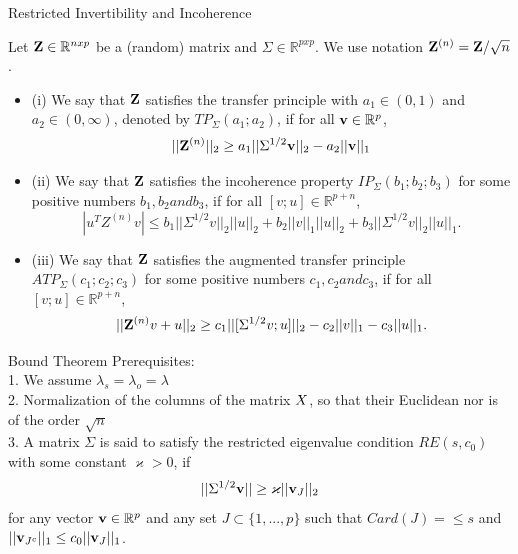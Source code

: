 \documentclass[unknownkeysallowed]{beamer}
\begin{document}
\begin{frame}{Restricted Invertibility and Incoherence}
	\begin{definition}
		Let $ \bold{Z} \in \mathbb{R}^{nxp} $ be a (random) matrix and $ \Sigma \in \mathbb{R}^{pxp} $. We use notation $ \bold{Z}^{(n)} = \bold{Z}/\sqrt{n}$.\\
		\begin{itemize}
			\item (i) We say that $\bold{Z}$ satisfies the transfer principle with $a_1 \in (0,1)$ and $a_2 \in (0,\infty)$, denoted by $TP_{\Sigma}(a_1;a_2)$, if for all $\bold{v} \in \mathbb{R}^p$,
			\begin{equation}
			||\bold{Z}^{(n)}||_2 \geq a_1 ||\Sigma^{1/2}\bold{v}||_2 - a_2||\bold{v}||_1
			\end{equation}
			
			\item (ii) We say that $\bold{Z}$ satisfies the incoherence property $IP_{\Sigma}(b_1;b_2;b_3)$ for some positive numbers $b_1, b_2 and b_3$, if for all $[v;u] \in \mathbb{R}^{p+n}$,
			\begin{equation}
			|u^T Z^{(n)}v| \leq b_1||\Sigma^{1/2}v||_2||u||_2 + b_2||v||_1||u||_2 + b_3||\Sigma^{1/2}v||_2||u||_1.
			\end{equation}
			\item (iii) We say that $ \bold{Z} $ satisfies the augmented transfer principle $ATP_{\Sigma}(c_1;c_2;c_3)$ for some positive numbers $c_1, c_2 and c_3$, if for all $[v;u]\in \mathbb{R}^{p+n}$,
			\begin{equation}
			||\bold{Z}^{(n)}v+u||_2 \geq c_1||[\Sigma^{1/2}v;u]||_2 - c_2||v||_1 - c_3||u||_1.
			\end{equation}
		\end{itemize}
	\end{definition}
\end{frame}


\begin{frame}{Bound Theorem}
	Prerequisites:\\
	1. We assume $\lambda_s = \lambda_o = \lambda$\\
	2. Normalization of the columns of the matrix $\boldmath{X}$, so that their Euclidean nor is of the order $\sqrt{n}$\\
	3. A matrix $\Sigma$ is said to satisfy the restricted eigenvalue condition $RE(s,c_0)$ with some constant $\varkappa >0$, if
	\begin{equation*}
	||\Sigma^{1/2}\bold{v}|| \geq \varkappa ||\bold{v}_J||_2
	\end{equation*}
	for any vector $\bold{v}\in \mathbb{R}^p$ and any set $J \subset \{1,...,p\}$ such that $Card(J) = \leq s$ and $||\bold{v}_{J^c}||_1 \leq c_0||\bold{v}_J||_1$.
	
\end{frame}
\end{document}
